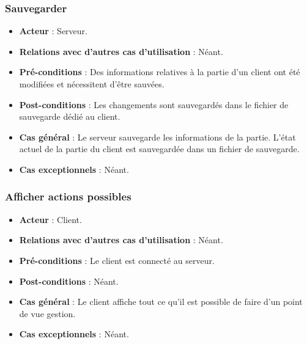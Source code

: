 \documentclass[a4paper,titlepage]{scrreprt}
\begin{document}
    \subsubsection{Sauvegarder}
      \begin{itemize}
        \item \textbf{Acteur}  : Serveur.
        \item \textbf{Relations avec d'autres cas d'utilisation}  : Néant.
        \item \textbf{Pré-conditions} : Des informations relatives à la partie d'un client ont été modifiées et nécessitent d'être sauvées.
        \item \textbf{Post-conditions} : Les changements sont sauvegardés dans le fichier de sauvegarde dédié au client.
        \item \textbf{Cas général} : Le serveur sauvegarde les informations de la partie. L’état actuel de la partie du client est sauvegardée dans un fichier de sauvegarde.
        \item \textbf{Cas exceptionnels} : Néant.
      \end{itemize}
    \subsubsection{Afficher actions possibles}
      \begin{itemize}
        \item \textbf{Acteur}  : Client.
        \item \textbf{Relations avec d'autres cas d'utilisation}  : Néant.
        \item \textbf{Pré-conditions} : Le client est connecté au serveur.
        \item \textbf{Post-conditions} : Néant.
        \item \textbf{Cas général} : Le client affiche tout ce qu’il est possible de faire d’un point de vue gestion.
        \item \textbf{Cas exceptionnels} : Néant.
      \end{itemize}
\end{document}
